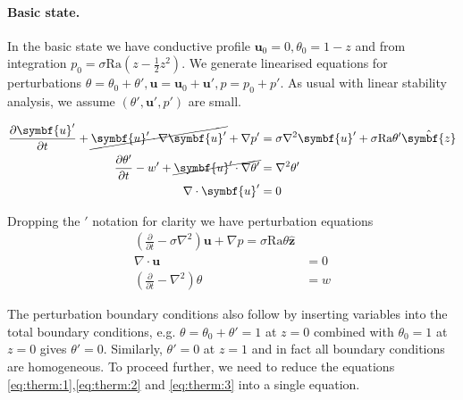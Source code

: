 \documentclass{jknotes}
\renewcommand{\u}{\symbf{u}}
\begin{document}
\paragraph{Basic state.}
In the basic state we have conductive profile $\u_0 = 0, \theta_0 = 1-z$ and
from integration $p_0 = \sigma \text{Ra}( z - \frac{1}{2}z^2)$. We generate
linearised equations for perturbations $\theta = \theta_0 + \theta', \u = \u_0
+ \u', p = p_0 + p'$. As usual with linear stability analysis, we assume
$(\theta', \u', p')$ are small.

\begin{align}
	\frac{\partial \u'}{\partial t} + \cancel{\u' \cdot \nabla \u'} + \nabla
	p' &= \sigma \nabla^2 \u' + \sigma \text{Ra} \theta' \hat{\symbf{z}} \\
	\frac{\partial \theta'}{\partial t} - w' + \cancel{\u' \cdot \nabla
	\theta'} &= \nabla^2 \theta' \\
	\nabla  \cdot \u' &= 0 
\end{align}

Dropping the $'$ notation for clarity we have perturbation equations
\begin{align}
	\left( \frac{\partial}{\partial t} - \sigma \nabla^2\right)\u + \nabla p =
	\sigma \text{Ra} \theta \hat{\symbf{z}} \label{eq:therm:1}\\
	\nabla \cdot \u &= 0 \label{eq:therm:2}\\
	\left( \frac{\partial}{\partial t} - \nabla^2\right)\theta &= w
	\label{eq:therm:3}
\end{align}

The perturbation boundary conditions also follow by inserting variables into
the total boundary conditions, e.g. $\theta = \theta_0 + \theta' = 1$ at $z=0$
combined with $\theta_0 = 1$ at $z=0$ gives $\theta' = 0$. Similarly, $\theta'
= 0$ at $z=1$ and in fact all boundary conditions are homogeneous. To proceed
further, we need to reduce the equations \eqref{eq:therm:1},\eqref{eq:therm:2}
and \eqref{eq:therm:3} into a single equation.
\end{document}
